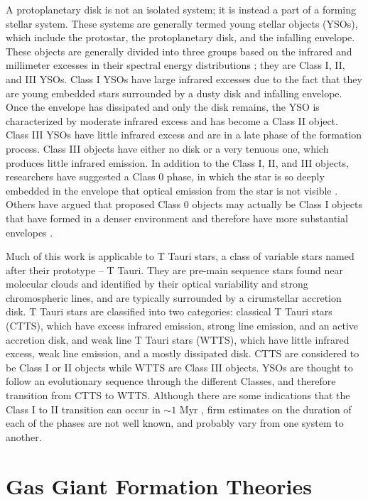 A protoplanetary disk is not an isolated system; it is instead a part of a forming stellar system. These systems are generally termed young stellar objects (YSOs), which include the protostar, the protoplanetary disk, and the infalling envelope. These objects are generally divided into three groups based on the infrared and millimeter excesses in their spectral energy distributions \citep{adams1987,kenyon1987,greene1994}; they are Class I, II, and III YSOs. Class I YSOs have large infrared excesses due to the fact that they are young embedded stars surrounded by a dusty disk and infalling envelope. Once the envelope has dissipated and only the disk remains, the YSO is characterized by moderate infrared excess and has become a Class II object. Class III YSOs have little infrared excess and are in a late phase of the formation process. Class III objects have either no disk or a very tenuous one, which produces little infrared emission. In addition to the Class I, II, and III objects, researchers have suggested a Class 0 phase, in which the star is so deeply embedded in the envelope that optical emission from the star is not visible \citep{andre1993}. Others have argued that proposed Class 0 objects may actually be Class I objects that have formed in a denser environment and therefore have more substantial envelopes \citep{jayaward2001}. 

Much of this work is applicable to T Tauri stars, a class of variable stars named after their prototype – T Tauri. They are pre-main sequence stars found near molecular clouds and identified by their optical variability and strong chromospheric  lines, and are typically surrounded by a cirumstellar accretion disk. T Tauri stars are classified into two categories: classical T Tauri stars (CTTS), which have excess infrared emission, strong line emission, and an active accretion disk, and weak line T Tauri stars (WTTS), which have little infrared excess, weak line emission, and a mostly dissipated disk. CTTS are considered to be Class I or II objects while WTTS are Class III objects. YSOs are thought to follow an evolutionary sequence through the different Classes, and therefore transition from CTTS to WTTS. Although there are some indications that the Class I to II transition can occur in $\sim1$ Myr \citep{eisner2006}, firm estimates on the duration of each of the phases are not well known, and probably vary from one system to another. 

\section{Gas Giant Formation Theories}\label{sec:theory}

